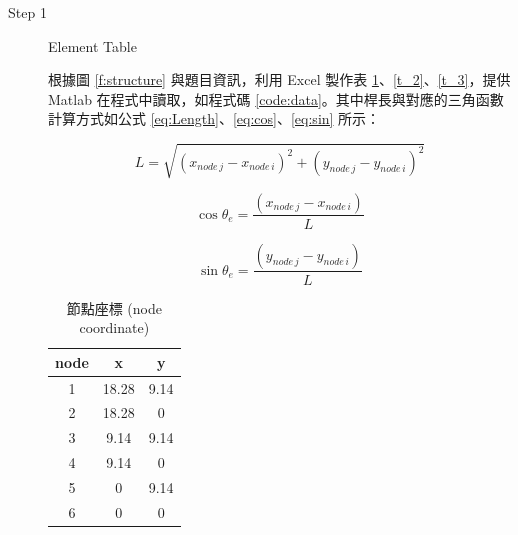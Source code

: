 \documentclass[12pt, a4paper]{article}
\begin{document}
\begin{enumerate}
    \begin{description}
        \item [Step 1] Element Table
        
        根據圖 \ref{f:structure} 與題目資訊，利用 Excel 製作表 \ref{t_1}、\ref{t_2}、\ref{t_3}，提供 Matlab 在程式中讀取，如程式碼 \ref{code:data}。其中桿長與對應的三角函數計算方式如公式 \ref{eq:Length}、\ref{eq:cos}、\ref{eq:sin} 所示：
        
        \begin{equation}
            L = \sqrt{(x_{node \, j}-x_{node \, i})^2 + (y_{node \, j}-y_{node \, i})^2}
            \label{eq:Length}
        \end{equation}
        
        \begin{equation}
            \cos \theta_e = \frac{(x_{node \, j}-x_{node \, i})}{L}
            \label{eq:cos}
        \end{equation}
        
        \begin{equation}
            \sin \theta_e = \frac{(y_{node \, j}-y_{node \, i})}{L}
            \label{eq:sin}
        \end{equation}
        
        \begin{table}[!h]
    		\caption{節點座標 (node coordinate)}
    		\label{t_1}
    		\centering
    		\begin{tabular}{ccc}
        		\toprule
        		node & x & y\\
        		\midrule
        		1 & 18.28 & 9.14 \\
        		2 & 18.28 & 0 \\
        		3 & 9.14 & 9.14 \\
        		4 & 9.14 & 0 \\
        		5 & 0 & 9.14 \\
        		6 & 0 & 0 \\
        		\bottomrule
    		\end{tabular}
	    \end{table}
	    

\end{description}
\end{enumerate}
\end{document}
